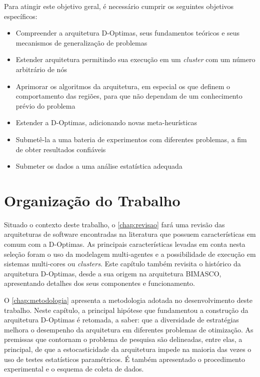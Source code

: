 Para atingir este objetivo geral, é necessário cumprir os seguintes objetivos específicos: 

\begin{itemize}
    \item Compreender a arquitetura D-Optimas, seus fundamentos teóricos e seus mecanismos de generalização de problemas
    \item Estender arquitetura permitindo sua execução em um \textit{cluster} com um número arbitrário de nós
    \item Aprimorar os algoritmos da arquitetura, em especial os que definem o comportamento das regiões, para que não dependam de um conhecimento prévio do problema 
    \item Estender a D-Optimas, adicionando novas meta-heurísticas
    \item Submetê-la a uma bateria de experimentos com diferentes problemas, a fim de obter resultados confiáveis
    \item Submeter os dados a uma análise estatística adequada 
\end{itemize}

\section{Organização do Trabalho}

Situado o contexto deste trabalho, o \autoref{chap:revisao} fará uma revisão das arquiteturas de software encontradas na literatura que possuem características em comum com a D-Optimas. As principais características levadas em conta nesta seleção foram o uso da modelagem multi-agentes e a possibilidade de execução em sistemas multi-cores ou \textit{clusters}. Este capítulo também revisita o histórico da arquitetura D-Optimas, desde a sua origem na arquitetura BIMASCO, apresentando detalhes dos seus componentes e funcionamento. 

O \autoref{chap:metodologia} apresenta a metodologia adotada no desenvolvimento deste trabalho. Neste capítulo, a principal hipótese que fundamentou a construção da arquitetura D-Optimas é retomada, a saber: que a diversidade de estratégias melhora o desempenho da arquitetura em diferentes problemas de otimização. As premissas que contornam o problema de pesquisa são delineadas, entre elas, a principal, de que a estocasticidade da arquitetura impede na maioria das vezes o uso de testes estatísticos paramétricos. É também apresentado o procedimento experimental e o esquema de coleta de dados.

